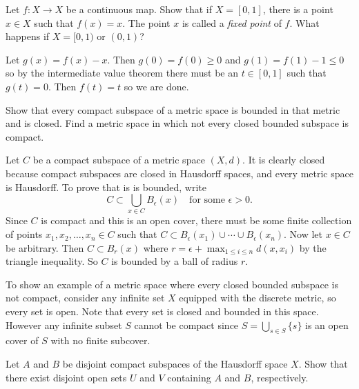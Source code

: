 \documentclass[11pt,letterpaper]{article}
\begin{document}
\begin{problem}
    Let $f : X \to X$ be a continuous map. Show that if $X=[0,1]$, there is a point $x\in X$ such that $f(x)=x$. The point $x$ is called a \emph{fixed point} of $f$. What happens if $X=[0,1)$ or $(0,1) $?  
\end{problem}

\begin{solution}
    Let $g(x)=f(x)-x$. Then $g(0)=f(0) \geq 0$ and $g(1)=f(1)-1 \leq 0$ so by the intermediate value theorem there must be an $t\in [0,1]$ such that $g(t)=0$. Then $f(t)=t$ so we are done.    
\end{solution}

\begin{problem}
    Show that every compact subspace of a metric space is bounded in that metric and is closed. Find a metric space in which not every closed bounded subspace is compact.
\end{problem}

\begin{solution}
    Let $C$ be a compact subspace of a metric space $(X,d)$. It is clearly closed because compact subspaces are closed in Hausdorff spaces, and every metric space is Hausdorff. To prove that is is bounded, write 
    \[
        C \subset \bigcup_{x\in C} B_\epsilon(x)\quad \textrm{for some }\epsilon>0
    .\] 
    Since $C$ is compact and this is an open cover, there must be some finite collection of points $x_1,x_2,\ldots,x_n\in C$ such that $C \subset B_\epsilon(x_1)\cup \cdots \cup B_\epsilon(x_n)$. Now let $x\in C$ be arbitrary. Then $C \subset B_r(x)$ where $r=\epsilon + \max_{1\leq i\leq n} d(x,x_i)$ by the triangle inequality. So $C$ is bounded by a ball of radius $r$.

    To show an example of a metric space where every closed bounded subspace is not compact, consider  any infinite set $X$ equipped with the discrete metric, so every set is open. Note that every set is closed and bounded in this space. However any infinite subset $S$ cannot be compact since $S=\bigcup_{s\in S}\{s\}$ is an open cover of $S$ with no finite subcover. 
\end{solution}

\begin{problem}
    Let $A$ and $B$ be disjoint compact subspaces of the Hausdorff space $X$. Show that there exist disjoint open sets $U$ and $V$ containing $A$ and $B$, respectively.
\end{problem}
\end{document}
